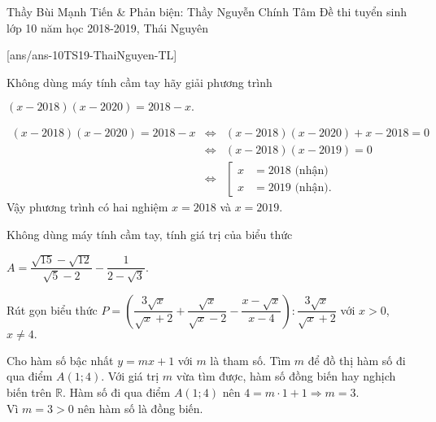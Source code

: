 \begin{name}
{Thầy Bùi Mạnh Tiến \& Phản biện: Thầy Nguyễn Chính Tâm}
{Đề thi tuyển sinh lớp 10 năm học 2018-2019, Thái Nguyên}
\end{name}
\setcounter{bt}{0}
[ans/ans-10TS19-ThaiNguyen-TL]
\begin{bt}%
	Không dùng máy tính cầm tay hãy giải phương trình
	\begin{center}
		$(x-2018)(x-2020)=2018-x.$
	\end{center}
	\loigiai
	{
		\begin{eqnarray*}
			(x-2018)(x-2020)=2018-x&\Leftrightarrow & (x-2018)(x-2020)+x-2018=0\\
			&\Leftrightarrow & (x-2018)(x-2019)=0\\
			&\Leftrightarrow & \left[\begin{aligned} x & =2018\text{ (nhận)}\\ x &=2019 \text{ (nhận)}. \end{aligned}\right.
		\end{eqnarray*}
		Vậy phương trình có hai nghiệm $x=2018$ và $x=2019.$
	}
\end{bt}
\begin{bt}%
	Không dùng máy tính cầm tay, tính giá trị của biểu thức
	\begin{center}
		$A=\dfrac{\sqrt{15}-\sqrt{12}}{\sqrt{5}-2}-\dfrac{1}{2-\sqrt{3}}.$
	\end{center}
\end{bt}
\begin{bt}%
	Rút gọn biểu thức $P=\left(\dfrac{3\sqrt{x}}{\sqrt{x}+2}+\dfrac{\sqrt{x}}{\sqrt{x}-2}-\dfrac{x-\sqrt{x}}{x-4}\right):\dfrac{3\sqrt{x}}{\sqrt{x}+2}$ với $x>0$, $x\ne 4.$
\end{bt}
\begin{bt}%
	Cho hàm số bậc nhất $y=mx+1$ với $m$ là tham số. Tìm $m$ để đồ thị hàm số đi qua điểm $A(1;4)$. Với giá trị $m$ vừa tìm được, hàm số đồng biến hay nghịch biến trên $\mathbb{R}.$
	\loigiai
	{
		Hàm số đi qua điểm $A(1;4)$ nên $4=m\cdot 1+1\Rightarrow m = 3.$\\
		Vì $m=3>0$ nên hàm số là đồng biến.	
	}
\end{bt}

